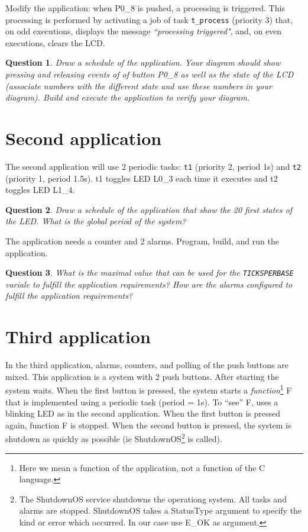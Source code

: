 \documentclass[11pt]{report}
\newtheorem{ex}{Question}
\begin{document}
Modify the application: when P0_8 is pushed, a processing is triggered.
This processing is performed by activating a job of task \texttt{t_process} (priority 3) that, on odd executions, displays the message \textsl{``processing triggered"}, and, on even executions, clears the LCD.
\begin{ex}
Draw a schedule of the application.
Your diagram should show pressing and releasing events of of button P0_8 as well as the state of the LCD (associate numbers with the different state and use these numbers in your diagram).
Build and execute the application to verify your diagram.
\end{ex}


\section{Second application}

The second application will use 2 periodic tasks: \texttt{t1} (priority 2, period 1s) and \texttt{t2} (priority 1, period 1.5s). t1 toggles LED L0_3 each time it executes and t2 toggles LED L1_4.

\begin{ex}
    Draw a schedule of the application that show the 20 first states of the LED.
    What is the global period of the system?
\end{ex}

The application needs a counter and 2 alarms. Program, build, and run the application.

\begin{ex}
What is the maximal value that can be used for the \texttt{TICKSPERBASE} variale to fulfill the application requirements?
How are the alarms configured to fulfill the application requirements?
\end{ex}

\section{Third application}

In the third application, alarms, counters, and polling of the push buttons are mixed.
This application is a system with 2 push buttons.
After starting the system waits.
When the first button is pressed, the system starts a {\it function}\footnote{Here we mean a function of the application, not a function of the C language.} F that is implemented using a periodic task (period = 1s).
To ``see'' F, uses a blinking LED as in the second application.
When the first button is pressed again, function F is stopped.
When the second button is pressed, the system is shutdown as quickly as possible (ie ShutdownOS\footnote{The ShutdownOS service shutdowns the operationg system. All tasks and alarms are stopped. ShutdownOS takes a StatusType argument to specify the kind or error which occurred. In our case use E_OK as argument.} is called).
\end{document}
